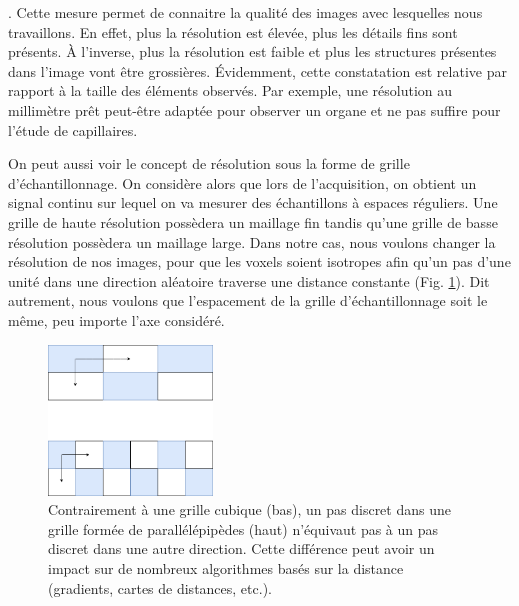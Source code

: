 . Cette mesure permet de connaitre la qualité des images avec lesquelles nous travaillons. En effet, plus la résolution est élevée, plus les détails fins sont présents. À l'inverse, plus la résolution est faible et plus les structures présentes dans l'image vont être grossières. Évidemment, cette constatation est relative par rapport à la taille des éléments observés. Par exemple, une résolution au millimètre prêt peut-être adaptée pour observer un organe et ne pas suffire pour l'étude de capillaires.

On peut aussi voir le concept de résolution sous la forme de grille d'échantillonnage. On considère alors que lors de l'acquisition, on obtient un signal continu sur lequel on va mesurer des échantillons à espaces réguliers. Une grille de haute résolution possèdera un maillage fin tandis qu'une grille de basse résolution possèdera un maillage large. Dans notre cas, nous voulons changer la résolution de nos images, pour que les voxels soient isotropes afin qu'un pas d'une unité dans une direction aléatoire traverse une distance constante (Fig. \ref{fig:resolution_voxels_shapes}). Dit autrement, nous voulons que l'espacement de la grille d'échantillonnage soit le même, peu importe l'axe considéré.

\begin{figure}[!ht]
  \centering
  \includegraphics[height=4cm]{Images/resolution_voxels_shape.png}
  \caption{Contrairement à une grille cubique (bas), un pas discret dans une grille formée de parallélépipèdes (haut) n'équivaut pas à un pas discret dans une autre direction. Cette différence peut avoir un impact sur de nombreux algorithmes basés sur la distance (gradients, cartes de distances, etc.).}
  \label{fig:resolution_voxels_shapes}
\end{figure}

